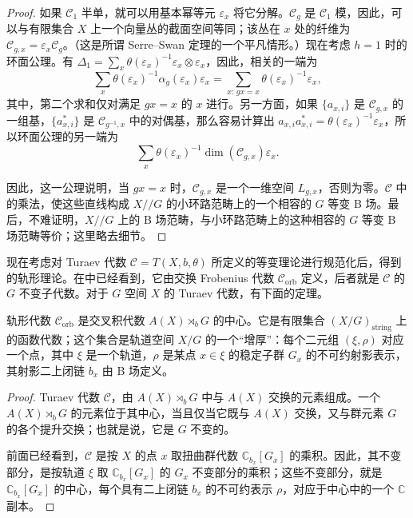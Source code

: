 \begin{proof}
如果 $\mathcal{C}_1$ 半单，就可以用基本幂等元 $\varepsilon_x$ 将它分解。$\mathcal{C}_g$ 是 $\mathcal{C}_1$ 模，因此，可以与有限集合 $X$ 上一个向量丛的截面空间等同；该丛在 $x$ 处的纤维为 $\mathcal{C}_{g,x}=\varepsilon_x\mathcal{C}_g$。（这是所谓 Serre--Swan 定理的一个平凡情形。）现在考虑 $h=1$ 时的环面公理。有 $\Delta_1=\sum_x\theta(\varepsilon_x)^{-1}\varepsilon_x\otimes\varepsilon_x$，因此，相关的一端为
\[
\sum_x\theta(\varepsilon_x)^{-1}\alpha_g(\varepsilon_x)\varepsilon_x
=\sum_{x:\,gx=x}\theta(\varepsilon_x)^{-1}\varepsilon_x,
\]
其中，第二个求和仅对满足 $gx=x$ 的 $x$ 进行。另一方面，如果 $\{a_{x,i}\}$ 是 $\mathcal{C}_{g,x}$ 的一组基，$\{a_{x,i}^*\}$ 是 $\mathcal{C}_{g^{-1},x}$ 中的对偶基，那么容易计算出 $a_{x,i}a_{x,i}^*=\theta(\varepsilon_x)^{-1}\varepsilon_x$，所以环面公理的另一端为
\[
\sum_x\theta(\varepsilon_x)^{-1}\dim(\mathcal{C}_{g,x})\varepsilon_x.
\]

因此，这一公理说明，当 $gx=x$ 时，$\mathcal{C}_{g,x}$ 是一个一维空间 $L_{g,x}$，否则为零。$\mathcal{C}$ 中的乘法，使这些直线构成 $X//G$ 的小环路范畴上的一个相容的 $G$ 等变 B 场。最后，不难证明，$X//G$ 上的 B 场范畴，与小环路范畴上的这种相容的 $G$ 等变 B 场范畴等价；这里略去细节。\BookQED
\end{proof}

现在考虑对 Turaev 代数 $\mathcal{C}=T(X,b,\theta)$ 所定义的等变理论进行规范化后，得到的轨形理论。在中已经看到，它由交换 Frobenius 代数 $\mathcal{C}_{\mathrm{orb}}$ 定义，后者就是 $\mathcal{C}$ 的 $G$ 不变子代数。对于 $G$ 空间 $X$ 的 Turaev 代数，有下面的定理。

\begin{theorem}\label{thm:2.14}
轨形代数 $\mathcal{C}_{\mathrm{orb}}$ 是交叉积代数 $A(X)\rtimes_bG$ 的中心。它是有限集合 $(X/G)_{\mathrm{string}}$ 上的函数代数；这个集合是轨道空间 $X/G$ 的一个“增厚”：每个二元组 $(\xi,\rho)$ 对应一个点，其中 $\xi$ 是一个轨道，$\rho$ 是某点 $x\in\xi$ 的稳定子群 $G_x$ 的不可约射影表示，其射影二上闭链 $b_x$ 由 B 场定义。
\end{theorem}

\begin{proof}
Turaev 代数 $\mathcal{C}$，由 $A(X)\rtimes_bG$ 中与 $A(X)$ 交换的元素组成。一个 $A(X)\rtimes_bG$ 的元素位于其中心，当且仅当它既与 $A(X)$ 交换，又与群元素 $G$ 的各个提升交换；也就是说，它是 $G$ 不变的。

前面已经看到，$\mathcal{C}$ 是按 $X$ 的点 $x$ 取扭曲群代数 $\mathbb{C}_{b_x}[G_x]$ 的乘积。因此，其不变部分，是按轨道 $\xi$ 取 $\mathbb{C}_{b_x}[G_x]$ 的 $G_x$ 不变部分的乘积；这些不变部分，就是 $\mathbb{C}_{b_x}[G_x]$ 的中心，每个具有二上闭链 $b_x$ 的不可约表示 $\rho$，对应于中心中的一个 $\mathbb{C}$ 副本。\BookQED
\end{proof}

